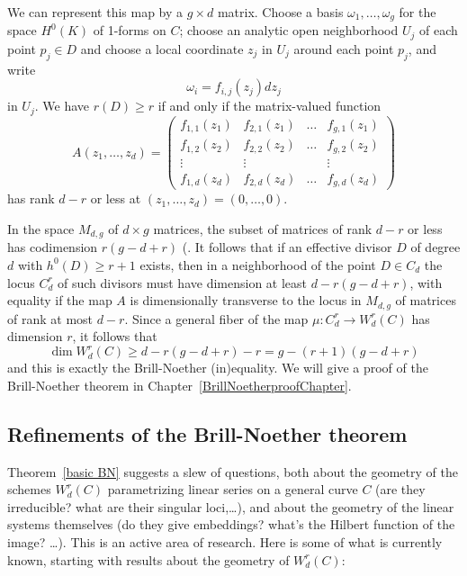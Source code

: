 We can represent this map by a $g \times d$ matrix. Choose a basis $\omega_1,\dots,\omega_g$ for the space $H^0(K)$ of 1-forms on $C$; choose an analytic open neighborhood $U_j$ of each point $p_j \in D$ and choose a local coordinate $z_j$ in $U_j$ around each point $p_j$, and write
$$
\omega_i = f_{i,j}(z_j)dz_j
$$
in $U_j$. We  have $r(D) \geq r$ if and only if the  matrix-valued function
$$
A(z_1,\dots,z_d) = 
\begin{pmatrix}
f_{1,1}(z_1) & f_{2,1}(z_1) & \dots & f_{g,1}(z_1) \\
f_{1,2}(z_2) & f_{2,2}(z_2) & \dots & f_{g,2}(z_2) \\
\vdots & \vdots &  & \vdots \\
f_{1,d}(z_d) & f_{2,d}(z_d) & \dots & f_{g,d} (z_d)
\end{pmatrix}
$$
has rank $d-r$ or less at $(z_1,\dots,z_d) = (0,\dots,0)$.


In the space $M_{d,g}$ of $d \times g$ matrices, the subset of matrices of rank $d-r$ or less has codimension $r(g-d+r)$ (\cite[Exercise 10.9]{Eisenbud1995}. 
It follows 
that if  an effective divisor $D$ of degree $d$ with $h^0(D) \geq r+1$ exists, then in a neighborhood of the point $D \in C_d$ the locus $C^r_d$ of such divisors must have dimension at least $d - r(g-d+r)$, with equality if the map $A$ is dimensionally transverse to the locus in $M_{d,g}$ of matrices of rank at most $d-r$. Since a general fiber of the map $\mu : C^r_d \to W^r_d(C)$ has dimension $r$, it follows that 
$$
\dim W^r_d(C) \geq d - r(g-d+r) - r = g - (r+1)(g-d+r)
$$
and this is exactly the  Brill-Noether (in)equality. We will give a proof of the Brill-Noether theorem in Chapter~\ref{BrillNoetherproofChapter}.


\subsection{Refinements of the Brill-Noether theorem}

Theorem~\ref{basic BN} suggests a slew of questions, both about the geometry of the schemes $W^r_d(C)$ parametrizing linear series on a general curve $C$ (are they irreducible? what are their singular loci,\dots), and about the geometry of the linear systems themselves (do they give embeddings? what's the Hilbert function of the image? \dots). This is an active area of research. Here is some of what is currently known, starting with results about the geometry of $W^r_d(C)$:

